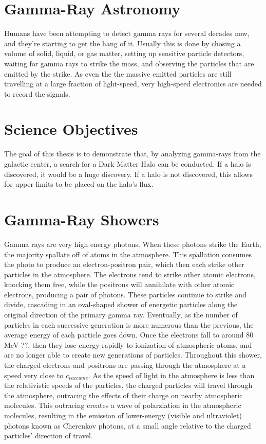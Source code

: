 \section{Gamma-Ray Astronomy}
Humans have been attempting to detect gamma rays for several decades now, and they're starting to get the hang of it.
Usually this is done by chosing a volume of solid, liquid, or gas matter, setting up sensitive particle detectors, waiting for gamma rays to strike the mass, and observing the particles that are emitted by the strike.
As even the the massive emitted particles are still travelling at a large fraction of light-speed, very high-speed electronics are needed to record the signals.

\section{Science Objectives}
The goal of this thesis is to demonstrate that, by analyzing gamma-rays from the galactic center, a search for a Dark Matter Halo can be conducted.
If a halo is discovered, it would be a huge discovery.
If a halo is not discovered, this allows for upper limits to be placed on the halo's flux.

\section{Gamma-Ray Showers}
Gamma rays are very high energy photons.
When these photons strike the Earth, the majority spallate off of atoms in the atmosphere.
This spallation consumes the photo to produce an electron-positron pair, which then each strike other particles in the atmosphere.
The electrons tend to strike other atomic electrons, knocking them free, while the positrons will annihilate with other atomic electrons, producing a pair of photons.
These particles continue to strike and divide, cascading in an oval-shaped shower of energetic particles along the original direction of the primary gamma ray.
Eventually, as the number of particles in each successive generation is more numerous than the previous, the average energy of each particle goes down.
Once the electrons fall to around 80 MeV ??, then they lose energy rapidly to ionization of atmospheric atoms, and are no longer able to create new generations of particles.
Throughout this shower, the charged electrons and positrons are passing through the atmosphere at a speed very close to $c_{vaccume}$.
As the speed of light in the atmosphere is less than the relativistic speeds of the particles, the charged particles will travel through the atmosphere, outracing the effects of their charge on nearby atmospheric molecules.
This outracing creates a wave of polarziation in the atmospheric molecules, resulting in the emission of lower-energy (visible and ultraviolet) photons known as Cherenkov photons, at a small angle relative to the charged particles' direction of travel.

